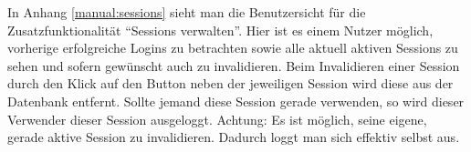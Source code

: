 \documentclass[12pt,DIV14,BCOR10mm,a4paper,parskip=half-,headsepline,headinclude,english,ngerman,bibliography=totocnumbered]{scrreprt}
\begin{document}
In Anhang \autoref{manual:sessions} sieht man die Benutzersicht für die Zusatzfunktionalität \enquote{Sessions verwalten}.
Hier ist es einem Nutzer möglich, vorherige erfolgreiche Logins zu betrachten sowie alle aktuell aktiven Sessions zu sehen und sofern gewünscht auch zu invalidieren.
Beim Invalidieren einer Session durch den Klick auf den Button neben der jeweiligen Session wird diese aus der Datenbank entfernt.
Sollte jemand diese Session gerade verwenden, so wird dieser Verwender dieser Session ausgeloggt.
Achtung: Es ist möglich, seine eigene, gerade aktive Session zu invalidieren.
Dadurch loggt man sich effektiv selbst aus.

\printbibliography

\printacronyms[title=Abkürzungsverzeichnis,toctitle=Abkürzungsverzeichnis]
\printglossary[title=Glossar,toctitle=Glossar,type=main]

\iftotalfigures
  \listoffigures
\fi

\end{document}
